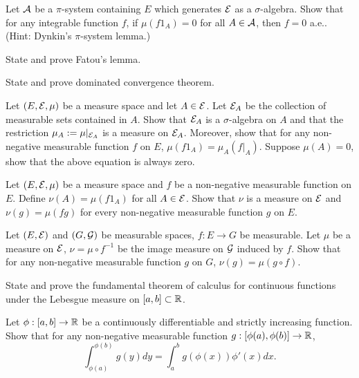 \begin{question}{14}
    Let $\mathcal{A}$ be a $\pi$-system containing $E$ which generates $\mathcal{E}$ as a $\sigma$-algebra. Show that for any integrable function $f$, if $\mu(f 1_A) = 0$ for all $A \in \mathcal{A}$, then $f = 0$ a.e.. (Hint: Dynkin's $\pi$-system lemma.)
\end{question}

\begin{question}{15}
    State and prove Fatou's lemma.

    State and prove dominated convergence theorem.
\end{question}

\begin{question}{16}
    Let $(E,\mathcal{E},\mu)$ be a measure space and let $A \in \mathcal{E}$. Let $\mathcal{E}_A$ be the collection of measurable sets contained in $A$. Show that $\mathcal{E}_A$ is a $\sigma$-algebra on $A$ and that the restriction $\mu_A := \mu|_{\mathcal{E}_A}$ is a measure on $\mathcal{E}_A$. Moreover, show that for any non-negative measurable function $f$ on $E$, $\mu(f 1_A) = \mu_A(f|_A)$. Suppose $\mu(A) = 0$, show that the above equation is always zero. 

    Let $(E,\mathcal{E},\mu)$ be a measure space and $f$ be a non-negative measurable function on $E$. Define $\nu(A) = \mu(f 1_A)$ for all $A \in \mathcal{E}$. Show that $\nu$ is a measure on $\mathcal{E}$ and $\nu(g) = \mu(fg)$ for every non-negative measurable function $g$ on $E$.

\end{question}

\begin{question}{17}
    Let $(E,\mathcal{E})$ and $(G,\mathcal{G})$ be measurable spaces, $f:E \rightarrow G$ be measurable. Let $\mu$ be a measure on $\mathcal{E}$, $\nu = \mu \circ f^{-1}$  be the image measure on $\mathcal{G}$ induced by $f$. Show that for any non-negative measurable function $g$ on $G$, $\nu(g) = \mu(g \circ f)$.
    
\end{question}

\begin{question}{18}
    State and prove the fundamental theorem of calculus for continuous functions under the Lebesgue measure on $[a,b] \subset \mathbb{R}$.

    Let $\phi : [a,b] \rightarrow \mathbb{R}$ be a continuously differentiable and strictly increasing function. Show that for any non-negative measurable function $g : [\phi(a),\phi(b)] \rightarrow \mathbb{R}$, 
    \[
    \int_{\phi(a)}^{\phi(b)}g(y) dy = \int_a^b g(\phi(x)) \phi'(x) dx.
    \]
\end{question}


